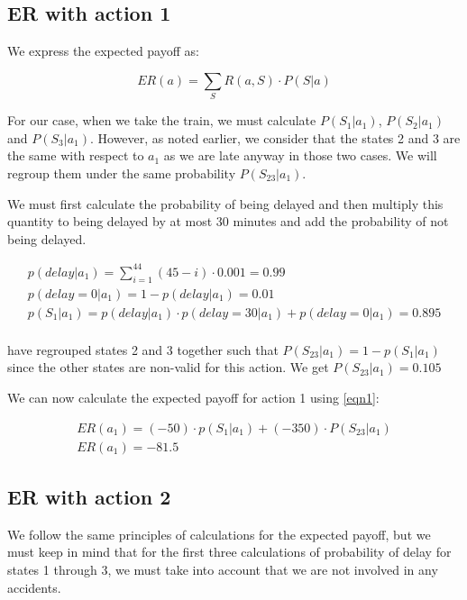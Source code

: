 \documentclass[letterpaper,12pt]{article}
\begin{document}
\subsection{ER with action 1}

We express the expected payoff as:

\begin{equation} 
\label{eqn1}
ER(a) = \sum_S R(a, S) \cdot P(S|a)
\end{equation}

For our case, when we take the train, we must calculate $P(S_1|a_1)$, $P(S_2|a_1)$ and $P(S_3|a_1)$. However, as noted earlier, we consider that the states 2 and 3 are the same with respect to $a_1$ as we are late anyway in those two cases. We will regroup them under the same probability $P(S_{23}|a_1)$.

We must first calculate the probability of being delayed and then multiply this quantity to being delayed by at most 30 minutes and add the probability of not being delayed.

\begin{align*}
p(delay| a_1) = \sum_{i=1}^{44} (45 - i) \cdot 0.001 = 0.99 \\
p(delay = 0| a_1) = 1 - p(delay| a_1) = 0.01 \\
p(S_1|a_1) = p(delay| a_1) \cdot p(delay = 30| a_1) + p(delay = 0| a_1) = 0.895 \\
\end{align*}

have regrouped states 2 and 3 together such that $P(S_{23}|a_1) = 1 - p(S_1|a_1)$ since the other states are non-valid for this action. We get $P(S_{23}|a_1) = 0.105$

We can now calculate the expected payoff for action 1 using \ref{eqn1}:


\begin{align*}
ER(a_1) = (-50) \cdot p(S_1|a_1) + (-350) \cdot P(S_{23}|a_1) \\
ER(a_1) = -81.5
\end{align*}

\subsection{ER with action 2}

We follow the same principles of calculations for the expected payoff, but we must keep in mind that for the first three calculations of probability of delay for states 1 through 3, we must take into account that we are not involved in any accidents.
\end{document}
